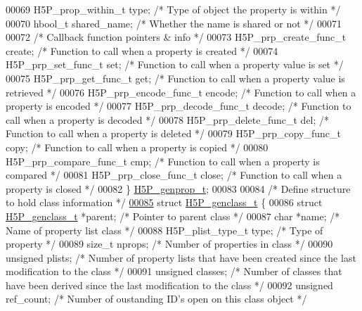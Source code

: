 \begin{DoxyCode}
00069     H5P\_prop\_within\_t type;     \textcolor{comment}{/* Type of object the property is within */}
00070     hbool\_t shared\_name;   \textcolor{comment}{/* Whether the name is shared or not */}
00071 
00072     \textcolor{comment}{/* Callback function pointers & info */}
00073     H5P\_prp\_create\_func\_t create;   \textcolor{comment}{/* Function to call when a property is created */}
00074     H5P\_prp\_set\_func\_t \textcolor{keyword}{set}; \textcolor{comment}{/* Function to call when a property value is set */}
00075     H5P\_prp\_get\_func\_t \textcolor{keyword}{get}; \textcolor{comment}{/* Function to call when a property value is retrieved */}
00076     H5P\_prp\_encode\_func\_t encode; \textcolor{comment}{/* Function to call when a property is encoded */}
00077     H5P\_prp\_decode\_func\_t decode; \textcolor{comment}{/* Function to call when a property is decoded */}
00078     H5P\_prp\_delete\_func\_t del; \textcolor{comment}{/* Function to call when a property is deleted */}
00079     H5P\_prp\_copy\_func\_t copy;  \textcolor{comment}{/* Function to call when a property is copied */}
00080     H5P\_prp\_compare\_func\_t cmp; \textcolor{comment}{/* Function to call when a property is compared */}
00081     H5P\_prp\_close\_func\_t close; \textcolor{comment}{/* Function to call when a property is closed */}
00082 \} \hyperlink{struct_h5_p__genprop__t}{H5P\_genprop\_t};
00083 
00084 \textcolor{comment}{/* Define structure to hold class information */}
\hyperlink{struct_h5_p__genclass__t}{00085} \textcolor{keyword}{struct }\hyperlink{struct_h5_p__genclass__t}{H5P\_genclass\_t} \{
00086     \textcolor{keyword}{struct }\hyperlink{struct_h5_p__genclass__t}{H5P\_genclass\_t} *parent;     \textcolor{comment}{/* Pointer to parent class */}
00087     \textcolor{keywordtype}{char}      *name;       \textcolor{comment}{/* Name of property list class */}
00088     H5P\_plist\_type\_t type; \textcolor{comment}{/* Type of property */}
00089     \textcolor{keywordtype}{size\_t}     nprops;     \textcolor{comment}{/* Number of properties in class */}
00090     \textcolor{keywordtype}{unsigned}   plists;     \textcolor{comment}{/* Number of property lists that have been created since the last modification
       to the class */}
00091     \textcolor{keywordtype}{unsigned}   classes;    \textcolor{comment}{/* Number of classes that have been derived since the last modification to the
       class */}
00092     \textcolor{keywordtype}{unsigned}   ref\_count;  \textcolor{comment}{/* Number of oustanding ID's open on this class object */}

\end{DoxyCode}
